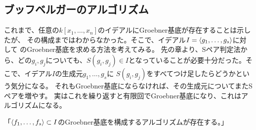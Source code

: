\subsection{ブッフベルガーのアルゴリズム}
\label{sub:ブッフベルガーのアルゴリズム}
これまで、任意の$k[x_1,\dots,x_n]$のイデアルにGroebner基底が存在することは示したが、
その構成まではわからなかった。そこで、イデアル$I=\left\langle g_1,\dots,g_s \right\rangle$に対して
のGroebner基底を求める方法を考えてみる。
先の章より、Sペア判定法から、どの$g_i,g_j$についても、$S(g_i,g_j) \in I$となっていることが必要十分だった。そこで、イデアル$I$の生成元$g_1,\dots,g_s$に
$S(g_i,g_j)$をすべてつけ足したらどうかという気分になる。
それもGroebner基底にならなければ、その生成元についてまたSペアを増やす。
実はこれを繰り返すと有限回でGroebner基底になり、これはアルゴリズムになる。

「$\left\langle f_1,\dots,f_s \right\rangle \subset I$のGroebner基底を構成するアルゴリズムが存在する。」
